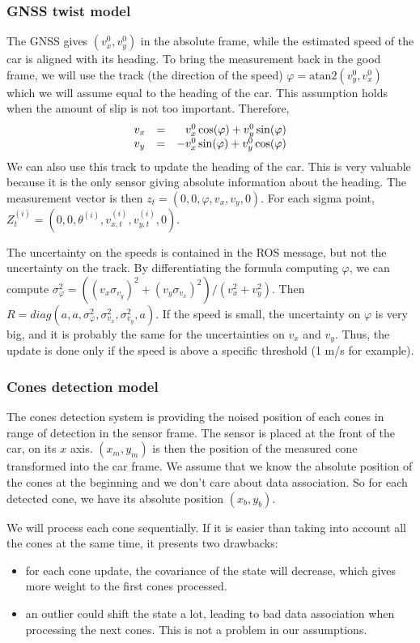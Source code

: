 \documentclass[10pt,a4paper, twocolumn]{article}
\begin{document}
\subsubsection{GNSS twist model}
The GNSS gives $(v_x^0, v_y^0)$ in the absolute frame, while the estimated speed of the car is aligned with its heading. To bring the measurement back in the good frame, we will use the track (the direction of the speed) $\varphi = \text{atan2}(v_y^0, v_x^0)$ which we will assume equal to the heading of the car. This assumption holds when the amount of slip is not too important. Therefore,
$$ \begin{array}{l c r}				
	v_x &=& v_x^0\cos(\varphi) + v_y^0\sin(\varphi) \\
	v_y &=& -v_x^0\sin(\varphi) + v_y^0\cos(\varphi)
\end{array} $$
We can also use this track to update the heading of the car. This is very valuable because it is the only sensor giving absolute information about the heading. The measurement vector is then $z_t = (0, 0, \varphi, v_x, v_y, 0)$. For each sigma point, $Z_t^{(i)} = (0, 0, \theta^{(i)}, v_{x, t}^{(i)}, v_{y, t}^{(i)}, 0)$.

The uncertainty on the speeds is contained in the ROS message, but not the uncertainty on the track. By differentiating the formula computing $\varphi$, we can compute $\sigma_\varphi^2 = ((v_x\sigma_{v_y})^2 + (v_y\sigma_{v_x})^2) / (v_x^2 + v_y^2)$. Then $R = diag(a, a, \sigma_\varphi^2, \sigma_{v_x}^2, \sigma_{v_y}^2, a)$. If the speed is small, the uncertainty on $\varphi$ is very big, and it is probably the same for the uncertainties on $v_x$ and $v_y$. Thus, the update is done only if the speed is above a specific threshold (1 m/s for example).

\subsubsection{Cones detection model}
The cones detection system is providing the noised position of each cones in range of detection in the sensor frame. The sensor is placed at the front of the car, on its $x$ axis. $(x_m, y_m)$ is then the position of the measured cone transformed into the car frame. We assume that we know the absolute position of the cones at the beginning and we don't care about data association. So for each detected cone, we have its absolute position $(x_b, y_b)$.

We will process each cone sequentially. If it is easier than taking into account all the cones at the same time, it presents two drawbacks:
\begin{itemize}
	\item for each cone update, the covariance of the state will decrease, which gives more weight to the first cones processed.
	\item an outlier could shift the state a lot, leading to bad data association when processing the next cones. This is not a problem in our assumptions.
\end{itemize}
\end{document}
